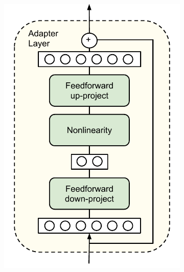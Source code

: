 \begin{figure}[htbp]
    \centering
    \begin{subfigure}[t]{0.5\textwidth}
        \centering
        \includegraphics[width=\textwidth]{figs/chapter3/adapters/adapter_arch.pdf}
    \end{subfigure}%
    \begin{subfigure}[t]{0.5\textwidth}
        \centering

\end{subfigure}
\end{figure}
